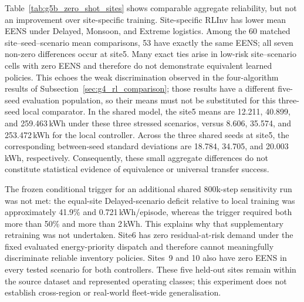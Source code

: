 \begin{revisedblock}
Table~\ref{tab:g5b_zero_shot_sites} shows comparable aggregate
reliability, but not an improvement over site-specific training.
Site-specific RLInv has lower mean EENS under Delayed, Monsoon, and
Extreme logistics. Among the 60 matched site--seed--scenario mean
comparisons, 53 have exactly the same EENS; all seven non-zero
differences occur at site5. Many exact ties arise in low-risk
site--scenario cells with zero EENS and therefore do not demonstrate
equivalent learned policies. This echoes the weak discrimination
observed in the four-algorithm results of
Subsection~\ref{sec:g4_rl_comparison}; those results have a different
five-seed evaluation population, so their means must not be substituted
for this three-seed local comparator. In the shared model, the site5 means are
12.211, 40.899, and 259.463\,kWh under these three stressed scenarios,
versus 8.606, 35.574, and 253.472\,kWh for the local controller.
Across the three shared seeds at site5, the corresponding between-seed
standard deviations are 18.784, 34.705, and 20.003\,kWh, respectively.
Consequently, these small aggregate differences do not constitute
statistical evidence of equivalence or universal transfer success.

The frozen conditional trigger for an additional shared 800k-step
sensitivity run was not met: the equal-site Delayed-scenario deficit
relative to local training was approximately 41.9\% and
0.721\,kWh/episode, whereas the trigger required both more than 50\%
and more than 2\,kWh. This explains why that supplementary retraining
was not undertaken. Site6 has zero residual-at-risk demand under the
fixed evaluated energy-priority dispatch and therefore cannot
meaningfully discriminate reliable inventory policies. Sites~9 and 10
also have zero EENS in every tested scenario for both controllers.
These five held-out sites remain within the source dataset and
represented operating classes; this experiment does not establish
cross-region or real-world fleet-wide generalisation.
\end{revisedblock}

